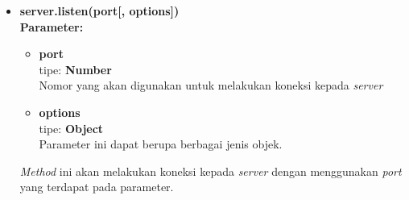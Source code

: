 \begin{enumerate}
\begin{itemize}
%			
	
%			
%			
			
			\item \textbf{server.listen(port[, options])} \\
			\textbf{Parameter:} 
			\begin{itemize}
				\item \textbf{port} \\tipe: \textbf{Number} \\ Nomor yang akan digunakan untuk melakukan koneksi kepada \textit{server}
				\item \textbf{options} \\tipe: \textbf{Object} \\ Parameter ini dapat berupa berbagai jenis objek.
			\end{itemize}
			\textit{Method} ini akan melakukan koneksi kepada \textit{server} dengan menggunakan \textit{port} yang terdapat pada parameter.
			

\end{itemize}
\end{enumerate}
